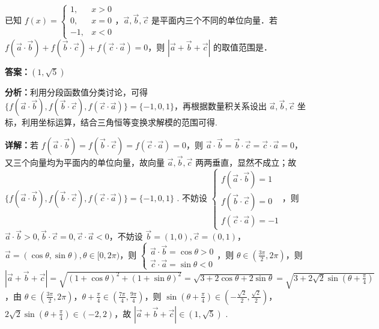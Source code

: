 \begin{question}[points=5]
已知 $f(x) = \begin{cases} 1, & x > 0 \\ 0, & x = 0 \\ -1, & x < 0 \end{cases}$，$\vec{a}, \vec{b}, \vec{c}$ 是平面内三个不同的单位向量．若 $f(\vec{a} \cdot \vec{b}) + f(\vec{b} \cdot \vec{c}) + f(\vec{c} \cdot \vec{a}) = 0$，则 $|\vec{a} + \vec{b} + \vec{c}|$ 的取值范围是．
\fillin[{$(1, \sqrt{5})$}]
\begin{solution}
\textbf{答案：}$(1, \sqrt{5})$

\textbf{分析：}利用分段函数值分类讨论，可得 $\{f(\vec{a} \cdot \vec{b}), f(\vec{b} \cdot \vec{c}), f(\vec{c} \cdot \vec{a})\} = \{-1, 0, 1\}$，再根据数量积关系设出 $\vec{a}, \vec{b}, \vec{c}$ 坐标，利用坐标运算，结合三角恒等变换求解模的范围可得.

\textbf{详解：}若 $f(\vec{a} \cdot \vec{b}) = f(\vec{b} \cdot \vec{c}) = f(\vec{c} \cdot \vec{a}) = 0$，则 $\vec{a} \cdot \vec{b} = \vec{b} \cdot \vec{c} = \vec{c} \cdot \vec{a} = 0$，又三个向量均为平面内的单位向量，故向量 $\vec{a}, \vec{b}, \vec{c}$ 两两垂直，显然不成立；故 $\{f(\vec{a} \cdot \vec{b}), f(\vec{b} \cdot \vec{c}), f(\vec{c} \cdot \vec{a})\} = \{-1, 0, 1\}$ . 不妨设 $\begin{cases} f(\vec{a} \cdot \vec{b}) = 1 \\ f(\vec{b} \cdot \vec{c}) = 0 \\ f(\vec{c} \cdot \vec{a}) = -1 \end{cases}$，则 $\vec{a} \cdot \vec{b} > 0, \vec{b} \cdot \vec{c} = 0, \vec{c} \cdot \vec{a} < 0$，不妨设 $\vec{b} = (1,0), \vec{c} = (0,1)$，$\vec{a} = (\cos \theta, \sin \theta), \theta \in [0, 2\pi)$，则 $\begin{cases} \vec{a} \cdot \vec{b} = \cos \theta > 0 \\ \vec{c} \cdot \vec{a} = \sin \theta < 0 \end{cases}$，则 $\theta \in \left(\frac{3\pi}{2}, 2\pi\right)$，则 $|\vec{a} + \vec{b} + \vec{c}| = \sqrt{(1+\cos \theta)^2 + (1+\sin \theta)^2} = \sqrt{3 + 2\cos \theta + 2\sin \theta} = \sqrt{3 + 2\sqrt{2}\sin\left(\theta + \frac{\pi}{4}\right)}$，由 $\theta \in \left(\frac{3\pi}{2}, 2\pi\right)$，$\theta + \frac{\pi}{4} \in \left(\frac{7\pi}{4}, \frac{9\pi}{4}\right)$，则 $\sin\left(\theta + \frac{\pi}{4}\right) \in \left(-\frac{\sqrt{2}}{2}, \frac{\sqrt{2}}{2}\right)$，$2\sqrt{2}\sin\left(\theta + \frac{\pi}{4}\right) \in (-2, 2)$，故 $|\vec{a} + \vec{b} + \vec{c}| \in (1, \sqrt{5})$ .
\end{solution}
\end{question}

